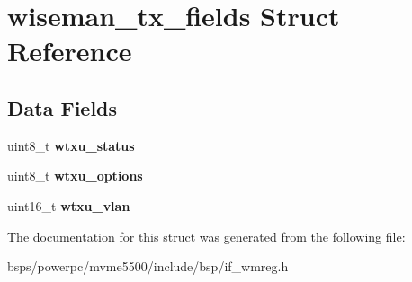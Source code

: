 \hypertarget{structwiseman__tx__fields}{}\section{wiseman\+\_\+tx\+\_\+fields Struct Reference}
\label{structwiseman__tx__fields}
\subsection*{Data Fields}
\begin{DoxyCompactItemize}
\item 
\mbox{\label{structwiseman__tx__fields_ac7f994f3df08cfc84cbb27056ed5d643}} 
uint8\+\_\+t {\bfseries wtxu\+\_\+status}
\item 
\mbox{\label{structwiseman__tx__fields_a6d55b31ec10f30b0d869b7d60cee7282}} 
uint8\+\_\+t {\bfseries wtxu\+\_\+options}
\item 
\mbox{\label{structwiseman__tx__fields_a284f52c16ef6b544305a7f7627b1b008}} 
uint16\+\_\+t {\bfseries wtxu\+\_\+vlan}
\end{DoxyCompactItemize}


The documentation for this struct was generated from the following file\+:\begin{DoxyCompactItemize}
\item 
bsps/powerpc/mvme5500/include/bsp/if\+\_\+wmreg.\+h\end{DoxyCompactItemize}

